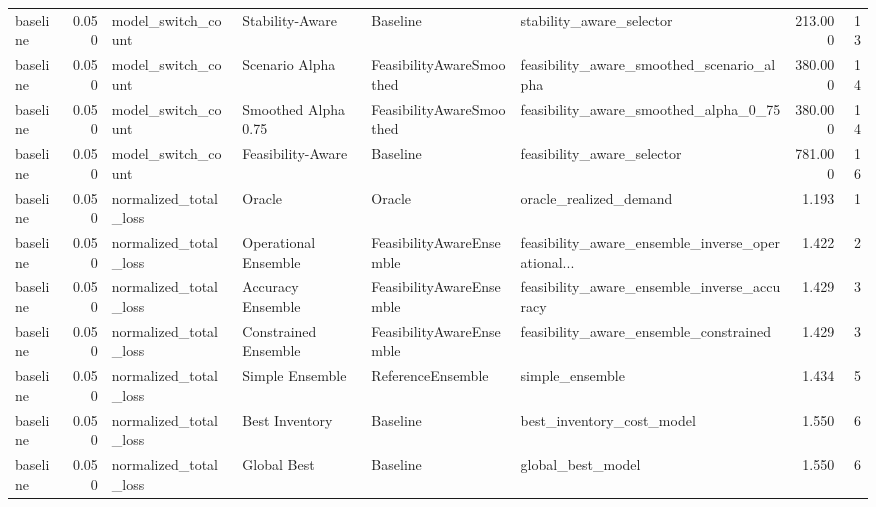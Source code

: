 \begin{table}
{\begin{tabular}{lrllllrr}
      baseline &             0.050 &          model\_switch\_count &       Stability-Aware &                  Baseline &                           stability\_aware\_selector &       213.000 &              13 \\
      baseline &             0.050 &          model\_switch\_count &        Scenario Alpha &  FeasibilityAwareSmoothed &          feasibility\_aware\_smoothed\_scenario\_alpha &       380.000 &              14 \\
      baseline &             0.050 &          model\_switch\_count &   Smoothed Alpha 0.75 &  FeasibilityAwareSmoothed &              feasibility\_aware\_smoothed\_alpha\_0\_75 &       380.000 &              14 \\
      baseline &             0.050 &          model\_switch\_count &     Feasibility-Aware &                  Baseline &                         feasibility\_aware\_selector &       781.000 &              16 \\
      baseline &             0.050 &       normalized\_total\_loss &                Oracle &                    Oracle &                             oracle\_realized\_demand &         1.193 &               1 \\
      baseline &             0.050 &       normalized\_total\_loss &  Operational Ensemble &  FeasibilityAwareEnsemble &  feasibility\_aware\_ensemble\_inverse\_operational... &         1.422 &               2 \\
      baseline &             0.050 &       normalized\_total\_loss &     Accuracy Ensemble &  FeasibilityAwareEnsemble &        feasibility\_aware\_ensemble\_inverse\_accuracy &         1.429 &               3 \\
      baseline &             0.050 &       normalized\_total\_loss &  Constrained Ensemble &  FeasibilityAwareEnsemble &             feasibility\_aware\_ensemble\_constrained &         1.429 &               3 \\
      baseline &             0.050 &       normalized\_total\_loss &       Simple Ensemble &         ReferenceEnsemble &                                    simple\_ensemble &         1.434 &               5 \\
      baseline &             0.050 &       normalized\_total\_loss &        Best Inventory &                  Baseline &                          best\_inventory\_cost\_model &         1.550 &               6 \\
      baseline &             0.050 &       normalized\_total\_loss &           Global Best &                  Baseline &                                  global\_best\_model &         1.550 &               6 \\

\end{tabular}}
\end{table}
